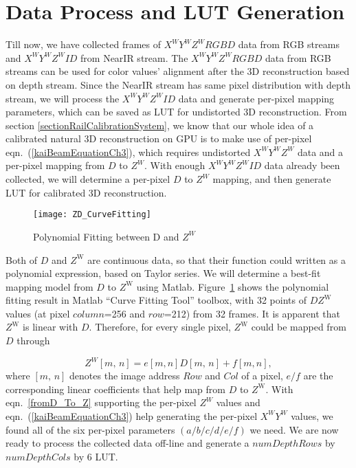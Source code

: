 \section{Data Process and LUT Generation}
Till now, we have collected frames of \(X^WY^WZ^WRGBD\) data from RGB streams and \(X^WY^WZ^WID\) from NearIR stream. The \(X^WY^WZ^WRGBD\) data from RGB streams can be used for color values' alignment after the 3D reconstruction based on depth stream. Since the NearIR stream has same pixel distribution with depth stream, we will process the \(X^WY^WZ^WID\) data and generate per-pixel mapping parameters, which can be saved as LUT for undistorted 3D reconstruction. From section \ref{sectionRailCalibrationSystem}, we know that our whole idea of a calibrated natural 3D reconstruction on GPU is to make use of per-pixel eqn.~(\ref{kaiBeamEquationCh3}), which requires undistorted \(X^WY^WZ^W\) data and a per-pixel mapping from \(D\) to \(Z^W\). With enough \(X^WY^WZ^WID\) data already been collected, we will determine a per-pixel \(D\) to \(Z^W\) mapping, and then generate LUT for calibrated 3D reconstruction.
\\\indent
\begin{figure}[t]
\centering
\texttt{[image: ZD\_CurveFitting]}
\caption{Polynomial Fitting between D and \(Z^W\)}
\label{ZD_CurveFitting}
\end{figure}%
%
Both of \(D\) and \(Z^\text{W}\) are continuous data, so that their function could written as a polynomial expression, based on Taylor series. We will determine a best-fit mapping model from \(D\) to \(Z^\text{W}\) using Matlab. Figure~\ref{ZD_CurveFitting} shows the polynomial fitting result in Matlab \enquote{Curve Fitting Tool} toolbox, with 32 points of \(DZ^\text{W}\) values (at pixel \(column\)=256 and \(row\)=212) from 32 frames. It is apparent that \(Z^\text{W}\) is linear with \(D\). Therefore, for every single pixel, \(Z^\text{W}\) could be mapped from \(D\) through \par
%
\begin{equation}
Z^W[m, \, n] = e[m, n]D[m, \, n]+f[m, n] ,
\label{fromD_To_Z}
\end{equation}%
%
\noindent
where \([m, \, n]\) denotes the image address \(Row\) and \(Col\) of a pixel, \(e/f\) are the corresponding linear coefficients that help map from \(D\) to \(Z^\text{W}\). With eqn.~\ref{fromD_To_Z} supporting the per-pixel \(Z^W\) values and eqn.~(\ref{kaiBeamEquationCh3}) help generating the per-pixel \(X^WY^W\) values, we found all of the six per-pixel parameters \((a/b/c/d/e/f)\) we need. We are now ready to process the collected data off-line and generate a \(numDepthRows\) by \(numDepthCols\) by 6 LUT.
